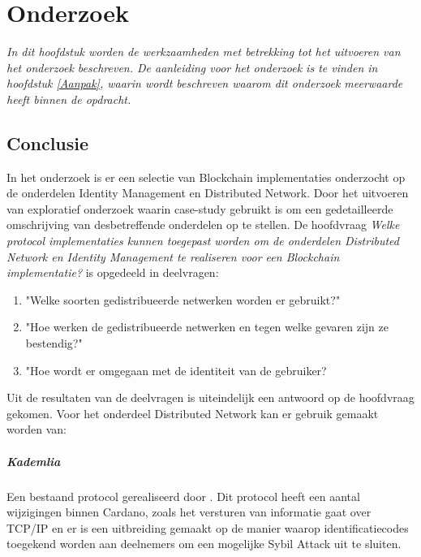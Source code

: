 \chapter{Onderzoek}
\textit{In dit hoofdstuk worden de werkzaamheden met betrekking tot het uitvoeren van het onderzoek beschreven. De aanleiding voor het onderzoek is te vinden in hoofdstuk \ref{Aanpak}, waarin wordt beschreven waarom dit onderzoek meerwaarde heeft binnen de opdracht.}



\newpage


\newpage


\newpage


\newpage
\section{Conclusie}

In het onderzoek is er een selectie van Blockchain implementaties onderzocht op de onderdelen Identity Management en Distributed Network. Door het uitvoeren van exploratief onderzoek waarin case-study gebruikt is om een gedetailleerde omschrijving van desbetreffende onderdelen op te stellen. De hoofdvraag \textit{Welke protocol implementaties kunnen toegepast worden om de onderdelen Distributed Network en Identity Management te realiseren voor een Blockchain implementatie?} is opgedeeld in deelvragen:

\begin{enumerate}[noitemsep]
  \item "Welke soorten gedistribueerde netwerken worden er gebruikt?"
  \item "Hoe werken de gedistribueerde netwerken en tegen welke gevaren zijn ze bestendig?"
  \item "Hoe wordt er omgegaan met de identiteit van de gebruiker?
\end{enumerate}

Uit de resultaten van de deelvragen is uiteindelijk een antwoord op de hoofdvraag gekomen. Voor het onderdeel Distributed Network kan er gebruik gemaakt worden van:

\paragraph{Kademlia}

Een bestaand protocol gerealiseerd door \cite{maymounkov2002kademlia}. Dit protocol heeft een aantal wijzigingen binnen Cardano, zoals het versturen van informatie gaat over TCP/IP en er is een uitbreiding gemaakt op de manier waarop identificatiecodes toegekend worden aan deelnemers om een mogelijke Sybil Attack uit te sluiten.

